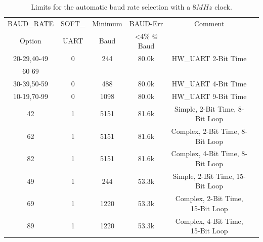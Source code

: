 \begin{table}[H]
  \begin{center}
    \begin{tabular}{| c | c | c | c | c | c |}
    \hline
   BAUD\_RATE  & SOFT\_ & Minimum   & BAUD-Err & Comment  \\
   Option      & UART   & Baud      & \textless 4\% @ Baud &  \\
    \hline
    \hline
  20-29,40-49  &  0     &  244      &   80.0k  & HW\_UART 2-Bit Time  \\
    60-69      &        &           &          &                    \\
    \hline
  30-39,50-59  &  0     &  488      &   80.0k  & HW\_UART 4-Bit Time  \\
    \hline
  10-19,70-99  &  0     &  1098     &   80.0k  & HW\_UART 9-Bit Time  \\
    \hline
    42         &  1     &  5151     &   81.6k  &  Simple, 2-Bit Time, 8-Bit Loop  \\
    \hline
    62         &  1     &  5151     &   81.6k  & Complex, 2-Bit Time, 8-Bit Loop  \\
    \hline
    82         &  1     &  5151     &   81.6k  & Complex, 4-Bit Time, 8-Bit Loop  \\
    \hline
    49         &  1     &  244      &   53.3k  &  Simple, 2-Bit Time, 15-Bit Loop \\
    \hline
    69         &  1     &  1220     &   53.3k  & Complex, 2-Bit Time, 15-Bit Loop \\
    \hline
    89         &  1     &  1220     &   53.3k  & Complex, 4-Bit Time, 15-Bit Loop \\
    \hline
    \end{tabular}
  \end{center}
  \caption{Limits for the automatic baud rate selection with a \(8MHz\) clock.}
  \label{tab:AutoBaud8}
\end{table}

